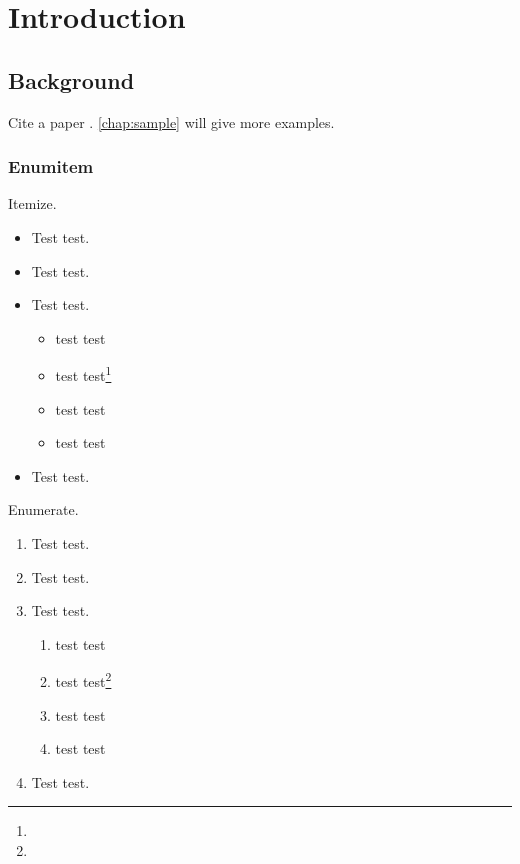 \chapter{Introduction}\label{chap:introduction}

\section{Background}\label{chap:intro:sec:background}

\blindtext

Cite a paper \cite{test}. \cref{chap:sample} will give more examples.

\subsection{Enumitem}

Itemize.

\begin{itemize}
  \item Test test.
  \item Test test.
  \item Test test.
  \begin{itemize}
    \item test test
    \item test test\footnote{\blindtext}
    \item test test
    \item test test
  \end{itemize}
  \item Test test.
\end{itemize}

Enumerate.

\begin{enumerate}
  \item Test test.
  \item Test test.
  \item Test test.
  \begin{enumerate}
    \item test test
    \item test test\footnote{\blindtext}
    \item test test
    \item test test
  \end{enumerate}
  \item Test test.
\end{enumerate}

